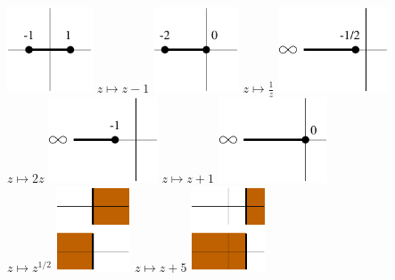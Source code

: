 {\begin{Solution}
\begin{enumerate}
    \includegraphics[height=1in]{fcv/function/5z1z1a}
    $z \mapsto z-1$
    \includegraphics[height=1in]{fcv/function/5z1z1b}
    $\displaystyle z \mapsto \frac{1}{z}$
    \includegraphics[height=1in]{fcv/function/5z1z1c}
    \\
    $z \mapsto 2 z$
    \includegraphics[height=1in]{fcv/function/5z1z1d}
    $z \mapsto z + 1$
    \includegraphics[height=1in]{fcv/function/5z1z1e}
    \\
    $\displaystyle z \mapsto z^{1/2}$
    \includegraphics[height=1in]{fcv/function/5z1z1f}
    $z \mapsto z + 5$
    \includegraphics[height=1in]{fcv/function/5z1z1g}


\end{enumerate}
\end{Solution}}
